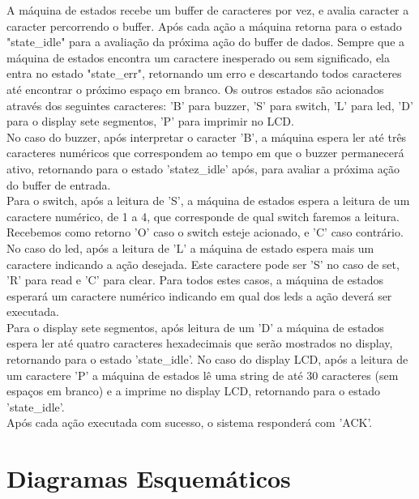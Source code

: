 \documentclass{article}
\begin{document}
A máquina de estados recebe um buffer de caracteres por vez, e avalia caracter a caracter percorrendo o buffer. Após cada ação a máquina retorna para o estado "state\_idle" para a avaliação da próxima ação do buffer de dados. Sempre que a máquina de estados encontra um caractere inesperado ou sem significado, ela entra no estado "state\_err", retornando um erro e descartando todos caracteres até encontrar o próximo espaço em branco. Os outros estados são acionados através dos seguintes caracteres: 'B' para buzzer, 'S' para switch, 'L' para led, 'D' para o display sete segmentos, 'P' para imprimir no LCD.\\
No caso do buzzer,  após interpretar o caracter 'B', a máquina espera ler até três caracteres numéricos que correspondem ao tempo em que o buzzer permanecerá ativo, retornando para o estado 'statez\_idle' após, para avaliar a próxima ação do buffer de entrada.\\
Para o switch, após a leitura de 'S', a máquina de estados espera a leitura de um caractere numérico, de 1 a 4, que corresponde de qual switch faremos a leitura. Recebemos como retorno 'O' caso o switch esteje acionado, e 'C' caso contrário.\\
No caso do led, após a leitura de 'L' a máquina de estado espera mais um caractere indicando a ação desejada. Este caractere pode ser 'S' no caso de set, 'R' para read e 'C' para clear. Para todos estes casos, a máquina de estados esperará um caractere numérico indicando em qual dos leds a ação deverá ser executada.\\
Para o display sete segmentos, após leitura de um 'D' a máquina de estados espera ler até quatro caracteres hexadecimais que serão mostrados no display, retornando para o estado 'state\_idle'.
No caso do display LCD, após a leitura de um caractere 'P' a máquina de estados lê uma string de até 30 caracteres (sem espaços em branco) e a imprime no display LCD, retornando para o estado 'state\_idle'.\\
Após cada ação executada com sucesso, o sistema responderá com 'ACK'.

\section{Diagramas Esquemáticos}
\end{document}
